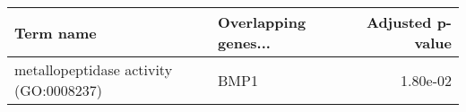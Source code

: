 \begin{tabular}{llr}
\toprule
                             Term name & Overlapping genes... &  Adjusted p-value \\
\midrule
metallopeptidase activity (GO:0008237) &                 BMP1 &          1.80e-02 \\
\bottomrule
\end{tabular}
